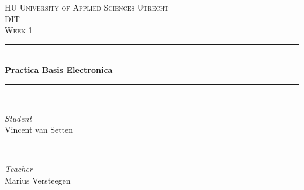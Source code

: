 \documentclass[fleqn]{article}
\newcommand\class{DIT}
\newcommand\classSubject{Practica Basis Electronica}
\newcommand\user{Vincent van Setten}
\newcommand\week{Week 1}
\newcommand\lecturer{Marius Versteegen}
\begin{document}
 

\renewcommand\makeheadrule{%
\begin{tikzpicture}[remember picture,overlay]
  \fill[hublue] 
  (-4,0) 
    rectangle
  (25, 20);
\end{tikzpicture}}

\begin{titlepage} 

{\selectfont
	\newcommand{\HRule}{\rule{\linewidth}{0.5mm}}
	
	\center
	
	
	\textsc{\LARGE HU University of Applied Sciences Utrecht}\\[1.5cm] 
	
	\textsc{\Large \class}\\[0.5cm] 
	
	\textsc{\large \week}\\[0.5cm]
	
	
	\HRule\\[0.4cm]
	
	{\huge\bfseries \classSubject}\\[0.4cm] %
	
	\HRule\\[1.5cm]
	
	
	\begin{minipage}{0.4\textwidth}
		\begin{flushleft}
			\large
			\textit{Student}\\
			\user %
		\end{flushleft}
	\end{minipage}
	~
	\begin{minipage}{0.4\textwidth}
		\begin{flushright}
			\large
			\textit{Teacher}\\
			\lecturer %
		\end{flushright}
	\end{minipage}
	
	
}
\end{titlepage}
\end{document}
